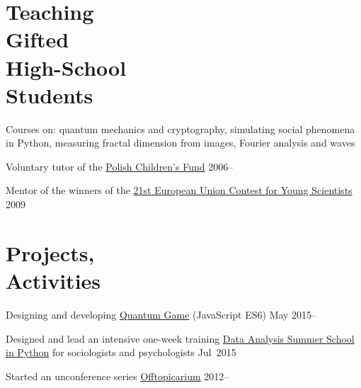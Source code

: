 \documentclass[margin,line]{resume}
\begin{document}
\begin{resume}


    \section{\mysidestyle Teaching\\Gifted\\High-School\\Students}
    \begin{list2}
        \item Courses on: quantum mechanics and cryptography, simulating social phenomena in Python, measuring fractal dimension from images, Fourier analysis and waves
        \item Voluntary tutor of the \href{http://www.fundusz.org/?lang=gb}{Polish Children's Fund} \hfill { 2006--}
        \item Mentor of the winners of the \href{http://www.eucys09.fr/}{21st European Union Contest for Young Scientists}\hfill { 2009}
    \end{list2} 

    \section{\mysidestyle Projects,\\Activities}

    \begin{list2}
        \item Designing and developing \href{http://quantumgame.io/}{Quantum Game} (JavaScript ES6) \hfill {May 2015--}
        \item Designed and lead an intensive one-week training \href{http://www.delab.uw.edu.pl/szkola-letnia-dane-2015/}{Data Analysis Summer School in Python} for sociologists and psychologists \hfill { Jul~2015} 
        \item Started an unconference series \href{http://offtopicarium.wikidot.com/}{Offtopicarium} \hfill { 2012--}


\end{list2}
\end{resume}
\end{document}
